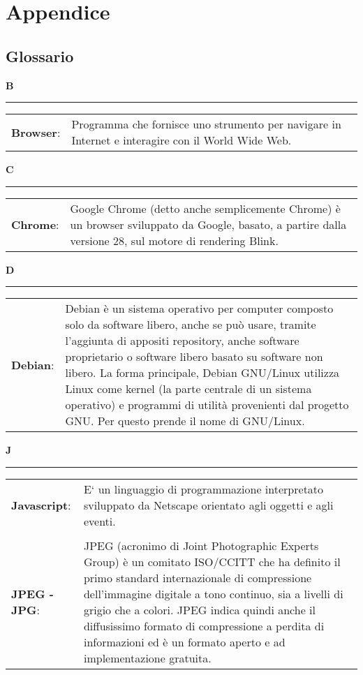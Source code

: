 \newpage
\section{Appendice}

\subsection{Glossario}
\hfill\Huge{\textbf{B}}\\
\rule{16cm}{.6pt}
\normalsize
	\begin{longtable}{p{} p{}} 
	    \\
		    \textbf{Browser}: &	Programma che fornisce uno strumento per navigare in Internet e interagire con il World Wide Web.\\
	\end{longtable}

\hfill\Huge{\textbf{C}}\\
\rule{16cm}{.6pt}
\normalsize
	\begin{longtable}{p{} p{}} 
	    \\
		    \textbf{Chrome}: & Google Chrome (detto anche semplicemente Chrome) è un browser sviluppato da Google, basato, a partire dalla versione 28, sul motore di rendering Blink.\\
	\end{longtable}
	
	\hfill\Huge{\textbf{D}}\\
\rule{16cm}{.6pt}
\normalsize
	\begin{longtable}{p{} p{}} 
	    \\
		    \textbf{Debian}: & Debian è un sistema operativo per computer composto solo da software libero, anche se può usare, tramite l'aggiunta di appositi repository, anche software proprietario o software libero basato su software non libero. La forma principale, Debian GNU/Linux utilizza Linux come kernel (la parte centrale di un sistema operativo) e programmi di utilità provenienti dal progetto GNU. Per questo prende il nome di GNU/Linux.\\
	\end{longtable}
	
\hfill\Huge{\textbf{J}}\\
\rule{16cm}{.6pt}
\normalsize
	\begin{longtable}{p{} p{}} 
	    \\
		    \textbf{Javascript}: & E` un linguaggio di programmazione interpretato sviluppato da Netscape orientato agli oggetti e agli eventi.\\
		    \\
		    \textbf{JPEG - JPG}: & JPEG (acronimo di Joint Photographic Experts Group) è un comitato ISO/CCITT che ha definito il primo standard internazionale di compressione dell'immagine digitale a tono continuo, sia a livelli di grigio che a colori. JPEG indica quindi anche il diffusissimo formato di compressione a perdita di informazioni ed è un formato aperto e ad implementazione gratuita.
	\end{longtable}
	
